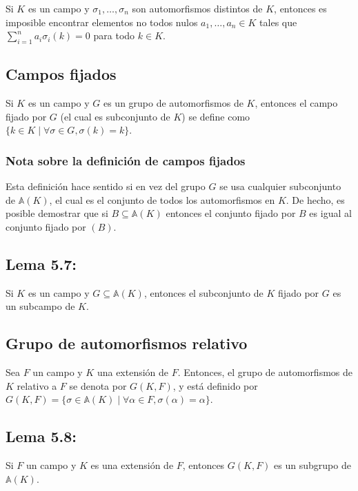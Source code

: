 \documentclass{article}
\begin{document}
Si $K$ es un campo y $\sigma_1,\ldots,\sigma_n$ son automorfismos distintos de $K$, entonces es imposible encontrar elementos no todos nulos $a_1,\ldots,a_n\in K$ tales que $\displaystyle\sum_{i=1}^n a_i\sigma_i(k)=0$ para todo $k\in K$.

\subsection*{\color{violet} Campos fijados}

Si $K$ es un campo y $G$ es un grupo de automorfismos de $K$, entonces el campo fijado por $G$ (el cual es subconjunto de $K$) se define como $\{k\in K\mid \forall\sigma\in G, \sigma(k)=k\}$.

\subsubsection*{\color{teal} Nota sobre la definición de campos fijados}

Esta definición hace sentido si en vez del grupo $G$ se usa cualquier subconjunto de $\mathbb{A}(K)$, el cual es el conjunto de todos los automorfismos en $K$. De hecho, es posible demostrar que si $B\subseteq\mathbb{A}(K)$ entonces el conjunto fijado por $B$ es igual al conjunto fijado por $(B)$. 

\subsection*{\color{blue} Lema 5.7:}

Si $K$ es un campo y $G\subseteq\mathbb{A}(K)$, entonces el subconjunto de $K$ fijado por $G$ es un subcampo de $K$.

\subsection*{\color{violet} Grupo de automorfismos relativo}

Sea $F$ un campo y $K$ una extensión de $F$. Entonces, el grupo de automorfismos de $K$ relativo a $F$ se denota por $G(K,F)$, y está definido por $G(K,F)=\{\sigma\in\mathbb{A}(K)\mid \forall\alpha\in F, \sigma(\alpha)=\alpha\}$.

\subsection*{\color{blue} Lema 5.8:}

Si $F$ un campo y $K$ es una extensión de $F$, entonces $G(K,F)$ es un subgrupo de $\mathbb{A}(K)$.
\end{document}
